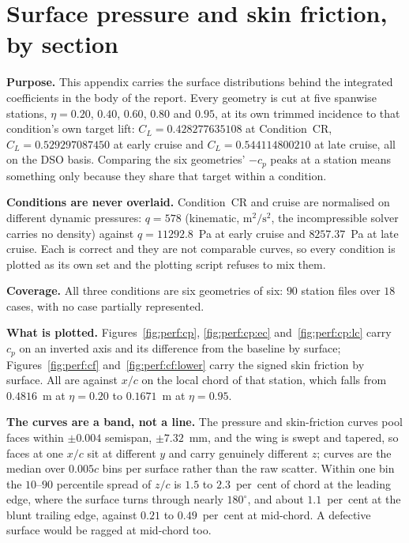 \section{Surface pressure and skin friction, by section}
\label{sec:app:sections}

\textbf{Purpose.} This appendix carries the surface distributions behind the integrated
coefficients in the body of the report. Every geometry is cut at five spanwise stations,
$\eta = 0.20$, $0.40$, $0.60$, $0.80$ and $0.95$, at its own trimmed incidence to that
condition's own target lift: $C_L = 0.428277635108$ at Condition~CR, $C_L = 0.529297087450$ at
early cruise and $C_L = 0.544114800210$ at late cruise, all on the DSO basis. Comparing the six geometries' $-c_p$ peaks at a station
means something only because they share that target within a condition.

\textbf{Conditions are never overlaid.} Condition~CR and cruise are normalised on different
dynamic pressures: $q = 578$ (kinematic, $\mathrm{m^2/s^2}$, the incompressible solver carries no
density) against $q = \num{11292.8}$~Pa at early cruise and $\num{8257.37}$~Pa at late cruise.
Each is correct and they are not comparable curves, so every condition is plotted as its own set
and the plotting script refuses to mix them.

\textbf{Coverage.} All three conditions are six geometries of six: $90$ station files over $18$
cases, with no case partially represented.

\textbf{What is plotted.} Figures~\ref{fig:perf:cp}, \ref{fig:perf:cp:ec} and~\ref{fig:perf:cp:lc} carry $c_p$ on an
inverted axis and its difference from the baseline by surface; Figures~\ref{fig:perf:cf}
and~\ref{fig:perf:cf:lower} carry the signed skin friction by surface. All are against $x/c$ on
the local chord of that station, which falls from $0.4816$~m at $\eta = 0.20$ to $0.1671$~m at
$\eta = 0.95$.

\textbf{The curves are a band, not a line.} The pressure and skin-friction
curves pool faces within $\pm 0.004$ semispan, $\pm 7.32$~mm, and the wing is swept and tapered,
so faces at one $x/c$ sit at different $y$ and carry genuinely different $z$; curves are the median
over $0.005c$ bins per surface rather than the raw scatter. Within one bin the $10$--$90$ percentile spread of $z/c$ is
$1.5$ to $2.3$~per~cent of chord at the leading edge, where the surface turns through nearly
$180^\circ$, and about $1.1$~per~cent at the blunt trailing edge, against $0.21$ to
$0.49$~per~cent at mid-chord. A defective surface would be ragged at mid-chord too.

